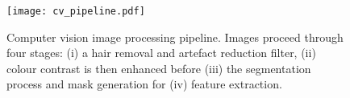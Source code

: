 \documentclass[
    man, 12pt, a4paper,
    donotrepeattitle, floatsintext, draftfirst
]{apa7}
\begin{document}
\begin{figure}
    \centering
    \texttt{[image: cv\_pipeline.pdf]}
    \caption[Computer vision pipeline]{Computer vision image processing pipeline. Images proceed through four stages: (i) a hair removal and artefact reduction filter, (ii) colour contrast is then enhanced before (iii) the segmentation process and mask generation for (iv) feature extraction.}
    \label{fig:cv}
\end{figure}
\end{document}
